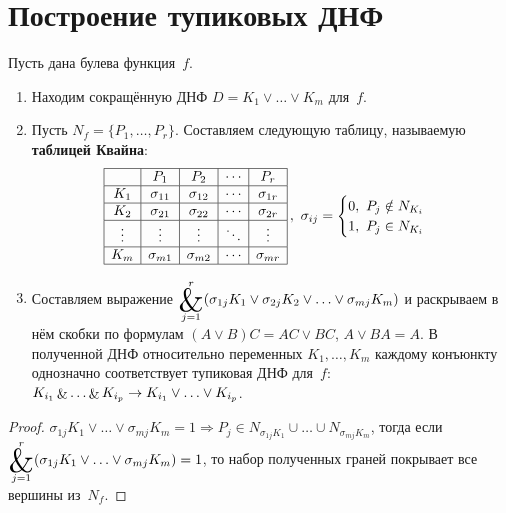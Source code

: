 \section{Построение тупиковых ДНФ}
Пусть дана булева функция~$f$.
\begin{enumerate}
	\item Находим сокращённую ДНФ $D = K_1 \lor \ldots \lor K_m$ для~$f$.
	
	\item Пусть $N_f = \{ P_1, \ldots, P_r \}$.
	Составляем следующую таблицу, называемую \textbf{таблицей Квайна}:
	\begin{equation*}
	\begin{array}{|c|c|c|c|c|}
	\hline
	    & P_1 & P_2 & \cdots & P_r \\
    \hline
	K_1 & \sigma_{11} & \sigma_{12} & \cdots & \sigma_{1r} \\
	\hline
	K_2 & \sigma_{21} & \sigma_{22} & \cdots & \sigma_{2r} \\
	\hline
	\vdots & \vdots & \vdots & \ddots & \vdots \\
	\hline
	K_m & \sigma_{m1} & \sigma_{m2} & \cdots & \sigma_{mr} \\
	\hline
	\end{array}\,, \
	\sigma_{ij} =
	\begin{cases}
	0, \ P_j \notin N_{K_i} \\
	1, \ P_j \in N_{K_i}
	\end{cases}
	\end{equation*}
	
	\item Составляем выражение $\displaystyle \bigAnd_{j=1}^r (\sigma_{1j} K_1 \lor \sigma_{2j} K_2 \lor \ldots \lor \sigma_{mj} K_m)$ и раскрываем в нём скобки по формулам $(A \lor B)C = AC \lor BC$, $A \lor BA = A$.
	В полученной ДНФ относительно переменных $K_1, \ldots, K_m$ каждому конъюнкту однозначно соответствует тупиковая ДНФ для~$f$: $K_{i_1} \And \ldots \And K_{i_p} \to K_{i_1} \opbr\lor \ldots \opbr\lor K_{i_p}$.
\end{enumerate}
\begin{proof}
$\sigma_{1j} K_1 \lor \ldots \lor \sigma_{mj} K_m = 1 \Rightarrow
P_j \in N_{\sigma_{1j} K_1} \cup \ldots \cup N_{\sigma_{mj} K_m}$, тогда если
$\displaystyle \bigAnd_{j=1}^r (\sigma_{1j} K_1 \opbr\lor \ldots \opbr\lor \sigma_{mj} K_m) = 1$, то набор полученных граней покрывает все вершины из~$N_f$.
\end{proof}